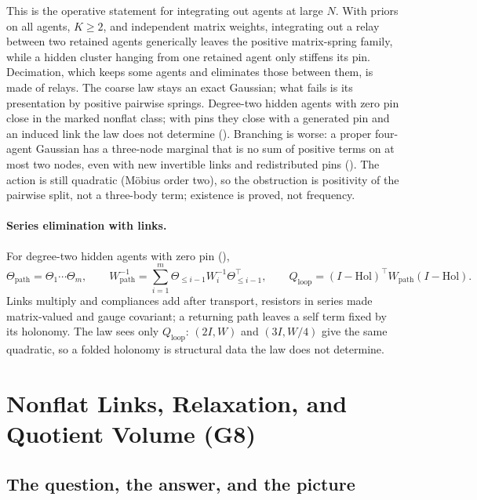 This is the operative statement for integrating out agents at large \(N\). With priors on all agents, \(K\geq2\), and
independent matrix weights, integrating out a relay between two retained agents generically leaves the positive
matrix-spring family, while a hidden cluster hanging from one retained agent only stiffens its pin. Decimation,
which keeps some agents and eliminates those between them, is made of relays. The coarse law stays an exact
Gaussian; what fails is its presentation by positive pairwise springs. Degree-two hidden agents with zero pin
close in the marked nonflat class; with pins they close with a generated pin and an induced link the law does not
determine (). Branching is worse: a proper four-agent Gaussian has a three-node
marginal that is no sum of positive terms on at most two nodes, even with new invertible links and redistributed
pins (). The action is still quadratic (M\"obius order two), so the
obstruction is positivity of the pairwise split, not a three-body term; existence is proved, not frequency.

\paragraph{Series elimination with links.} For degree-two hidden agents with zero pin
(),
\[
\Theta_{\mathrm{path}}=\Theta_1\cdots\Theta_m,\qquad
W_{\mathrm{path}}^{-1}=\sum_{i=1}^m\Theta_{\leq i-1}W_i^{-1}\Theta_{\leq i-1}^\top,\qquad
Q_{\mathrm{loop}}=(I-\mathrm{Hol})^\top W_{\mathrm{path}}(I-\mathrm{Hol}).
\]
Links multiply and compliances add after transport, resistors in series made matrix-valued and gauge covariant; a
returning path leaves a self term fixed by its holonomy. The law sees only \(Q_{\mathrm{loop}}\): \((2I,W)\) and
\((3I,W/4)\) give the same quadratic, so a folded holonomy is structural data the law does not determine.

\section{Nonflat Links, Relaxation, and Quotient Volume (G8)}
\label{comp:sg2-nonflat}

\subsection{The question, the answer, and the picture}

